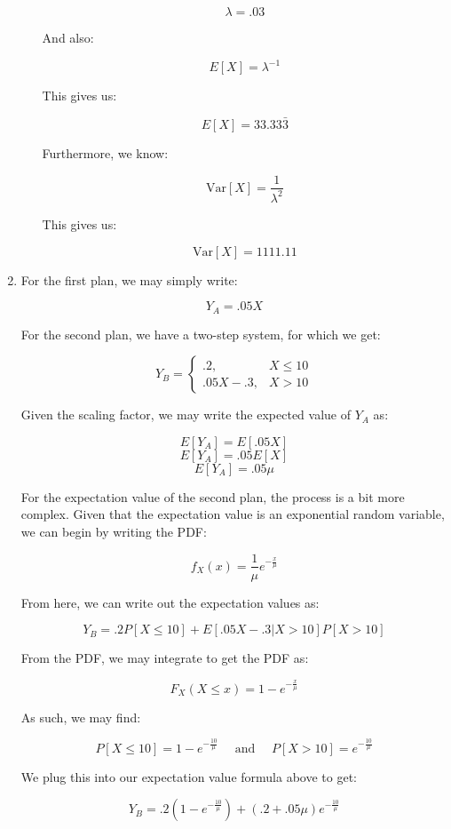 \begin{enumerate}
\begin{enumerate}
        $$\lambda=.03$$

        And also:

        $$E[X]=\lambda^{-1}$$

        This gives us:

        $$\boxed{E[X]=33.33\bar{3}}$$

        Furthermore, we know:

        $$\text{Var}[X]=\frac{1}{\lambda^2}$$

        This gives us:

        $$\boxed{\text{Var}[X]=1111.11}$$

    \end{enumerate}

  \item

    For the first plan, we may simply write:

    $$\boxed{Y_A=.05X}$$

    For the second plan, we have a two-step system, for which we get:

    $$\boxed{Y_B=\left\{\begin{array}{ll} .2,& X\leq 10\\ .05X-.3,& X>10\end{array}}$$

    Given the scaling factor, we may write the expected value of $Y_A$ as:

    $$E[Y_A]=E[.05X]$$
    $$E[Y_A]=.05E[X]$$
    $$\boxed{E[Y_A]=.05\mu}$$

    For the expectation value of the second plan, the process is a bit more complex. Given that the expectation value is an exponential random variable, we can begin by writing the PDF:

    $$f_X(x)=\frac{1}{\mu}e^{-\frac{x}{\mu}}$$

    From here, we can write out the expectation values as:

    $$Y_B=.2P[X\leq10]+E[.05X-.3|X>10]P[X>10]$$

    From the PDF, we may integrate to get the PDF as:

    $$F_X(X\leq x)=1-e^{-\frac{x}{\mu}}$$

    As such, we may find:

    $$P[X\leq 10]=1-e^{-\frac{10}{\mu}}\quad\text{ and }\quad P[X>10]=e^{-\frac{10}{\mu}}$$

    We plug this into our expectation value formula above to get:

    $$Y_B=.2\left( 1-e^{-\frac{10}{\mu}} \right)+(.2+.05\mu)e^{-\frac{10}{\mu}}$$


\end{enumerate}

